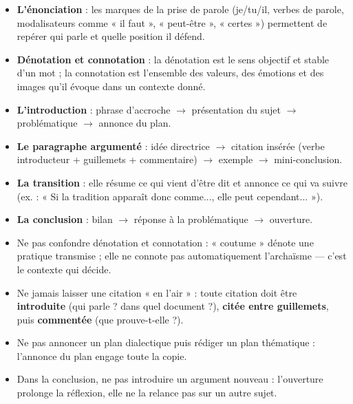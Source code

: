 \documentclass[11pt]{article}
\newcommand{\cle}[1]{{\popxbold\color{popdark}#1}}
\begin{document}
\begin{aretenir}
\begin{itemize}
\item \textbf{L'énonciation} : les marques de la prise de parole (je/tu/il, verbes de parole, modalisateurs comme « il faut », « peut-être », « certes ») permettent de repérer qui parle et quelle position il défend.
\item \textbf{Dénotation et connotation} : la dénotation est le sens objectif et stable d'un mot ; la connotation est l'ensemble des valeurs, des émotions et des images qu'il évoque dans un contexte donné.
\item \textbf{L'introduction} : phrase d'accroche $\rightarrow$ présentation du sujet $\rightarrow$ problématique $\rightarrow$ annonce du plan.
\item \textbf{Le paragraphe argumenté} : idée directrice $\rightarrow$ citation insérée (verbe introducteur + guillemets + commentaire) $\rightarrow$ exemple $\rightarrow$ mini-conclusion.
\item \textbf{La transition} : elle résume ce qui vient d'être dit et annonce ce qui va suivre (ex. : « Si la tradition apparaît donc comme..., elle peut cependant... »).
\item \textbf{La conclusion} : bilan $\rightarrow$ réponse à la problématique $\rightarrow$ ouverture.
\end{itemize}
\end{aretenir}

\begin{attention}
\begin{itemize}
\item Ne pas confondre \cle{dénotation} et \cle{connotation} : « coutume » dénote une pratique transmise ; elle ne connote pas automatiquement l'archaïsme — c'est le contexte qui décide.
\item Ne jamais laisser une citation « en l'air » : toute citation doit être \textbf{introduite} (qui parle ? dans quel document ?), \textbf{citée entre guillemets}, puis \textbf{commentée} (que prouve-t-elle ?).
\item Ne pas annoncer un plan dialectique puis rédiger un plan thématique : l'annonce du plan engage toute la copie.
\item Dans la conclusion, ne pas introduire un argument nouveau : l'ouverture prolonge la réflexion, elle ne la relance pas sur un autre sujet.
\end{itemize}
\end{attention}
\end{document}
